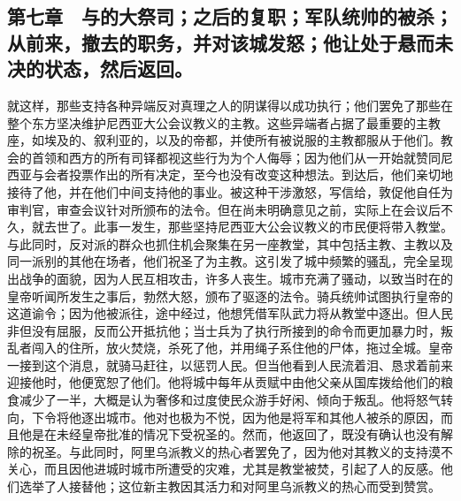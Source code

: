 
\subsection{第七章　与的大祭司；之后的复职；军队统帅的被杀；从前来，撤去的职务，并对该城发怒；他让处于悬而未决的状态，然后返回。}

就这样，那些支持各种异端反对真理之人的阴谋得以成功执行；他们罢免了那些在整个东方坚决维护尼西亚大公会议教义的主教。这些异端者占据了最重要的主教座，如埃及的、叙利亚的，以及的帝都，并使所有被说服的主教都服从于他们。教会的首领和西方的所有司铎都视这些行为为个人侮辱；因为他们从一开始就赞同尼西亚与会者投票作出的所有决定，至今也没有改变这种想法。到达后，他们亲切地接待了他，并在他们中间支持他的事业。被这种干涉激怒，写信给，敦促他自任为审判官，审查会议针对所颁布的法令。但在尚未明确意见之前，实际上在会议后不久，就去世了。此事一发生，那些坚持尼西亚大公会议教义的市民便将带入教堂。与此同时，反对派的群众也抓住机会聚集在另一座教堂，其中包括主教、主教以及同一派别的其他在场者，他们祝圣了为主教。这引发了城中频繁的骚乱，完全呈现出战争的面貌，因为人民互相攻击，许多人丧生。城市充满了骚动，以致当时在的皇帝听闻所发生之事后，勃然大怒，颁布了驱逐的法令。骑兵统帅试图执行皇帝的这道谕令；因为他被派往，途中经过，他想凭借军队武力将从教堂中逐出。但人民非但没有屈服，反而公开抵抗他；当士兵为了执行所接到的命令而更加暴力时，叛乱者闯入的住所，放火焚烧，杀死了他，并用绳子系住他的尸体，拖过全城。皇帝一接到这个消息，就骑马赶往，以惩罚人民。但当他看到人民流着泪、恳求着前来迎接他时，他便宽恕了他们。他将城中每年从贡赋中由他父亲从国库拨给他们的粮食减少了一半，大概是认为奢侈和过度使民众游手好闲、倾向于叛乱。他将怒气转向，下令将他逐出城市。他对也极为不悦，因为他是将军和其他人被杀的原因，而且他是在未经皇帝批准的情况下受祝圣的。然而，他返回了，既没有确认也没有解除的祝圣。与此同时，阿里乌派教义的热心者罢免了，因为他对其教义的支持漠不关心，而且因他进城时城市所遭受的灾难，尤其是教堂被焚，引起了人的反感。他们选举了人接替他；这位新主教因其活力和对阿里乌派教义的热心而受到赞赏。\par

